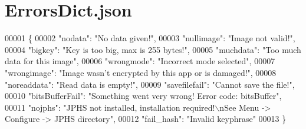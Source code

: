 \hypertarget{_errors_dict_8json}{\section{Errors\-Dict.\-json}
\label{_errors_dict_8json}
}

\begin{DoxyCode}
00001 \{
00002     \textcolor{stringliteral}{"nodata"}: \textcolor{stringliteral}{"No data given!"},
00003     \textcolor{stringliteral}{"nullimage"}: \textcolor{stringliteral}{"Image not valid!"},
00004     \textcolor{stringliteral}{"bigkey"}: \textcolor{stringliteral}{"Key is too big, max is 255 bytes!"},
00005     \textcolor{stringliteral}{"muchdata"}: \textcolor{stringliteral}{"Too much data for this image"},
00006     \textcolor{stringliteral}{"wrongmode"}: \textcolor{stringliteral}{"Incorrect mode selected"},
00007     \textcolor{stringliteral}{"wrongimage"}: \textcolor{stringliteral}{"Image wasn't encrypted by this app or is damaged!"},
00008     \textcolor{stringliteral}{"noreaddata"}: \textcolor{stringliteral}{"Read data is empty!"},
00009     \textcolor{stringliteral}{"savefilefail"}: \textcolor{stringliteral}{"Cannot save the file!"},
00010     \textcolor{stringliteral}{"bitsBufferFail"}: \textcolor{stringliteral}{"Something went very wrong! Error code: bitsBuffer"},
00011     \textcolor{stringliteral}{"nojphs"}: \textcolor{stringliteral}{"JPHS not installed, installation required!\(\backslash\)nSee Menu -> Configure -> JPHS directory"},
00012     \textcolor{stringliteral}{"fail\_hash"}: \textcolor{stringliteral}{"Invalid keyphrase"}
00013 \}
\end{DoxyCode}

